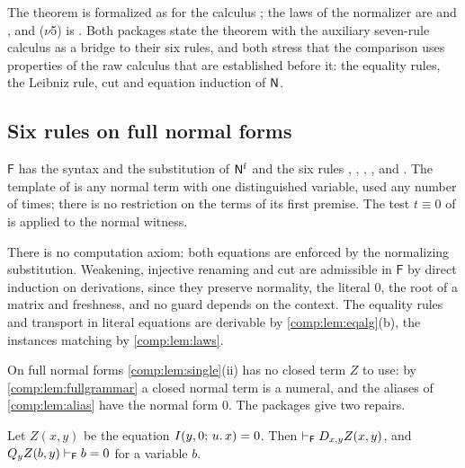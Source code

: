 \begin{remark}
The theorem is formalized as  for the calculus
; the laws of the normalizer are 
and , and ($\nu$5) is . Both
packages state the theorem with the auxiliary seven-rule calculus as a
bridge to their six rules, and both stress that the comparison uses
properties of the raw calculus that are established before it: the equality
rules, the Leibniz rule, cut and equation induction of $\mathsf{N}$.
\end{remark}

\subsection{Six rules on full normal forms}

\begin{definition}
\label{comp:def:fsix}
$\mathsf{F}$ has the syntax and the substitution of $\mathsf{N}^{\mathrm f}$ and
the six rules , , ,
,  and . The template of
 is any normal term with one distinguished variable, used any
number of times; there is no restriction on the terms of its first premise.
The test $t\equiv0$ of  is applied to the normal witness.
\end{definition}

There is no computation axiom: both equations are enforced by the
normalizing substitution. Weakening, injective renaming and cut are
admissible in $\mathsf{F}$ by direct induction on derivations, since they
preserve normality, the literal $0$, the root of a matrix and freshness, and
no guard depends on the context. The equality rules and transport in literal
equations are derivable by \cref{comp:lem:eqalg}(b), the instances matching
by \cref{comp:lem:laws}.

On full normal forms \cref{comp:lem:single}(ii) has no closed term $Z$ to
use: by \cref{comp:lem:fullgrammar} a closed normal term is a numeral, and
the aliases of \cref{comp:lem:alias} have the normal form $0$. The packages
give two repairs.

\begin{lemma}
\label{comp:lem:freshzero}
Let $Z(x,y)$ be the equation $I(y,0;\,u.\,x)=0$. Then
$\vdash_{\mathsf F}D_{x,y}Z(x,y)$, and
$Q_{y}Z(b,y)\vdash_{\mathsf F}b=0$ for a variable $b$.
\end{lemma}

